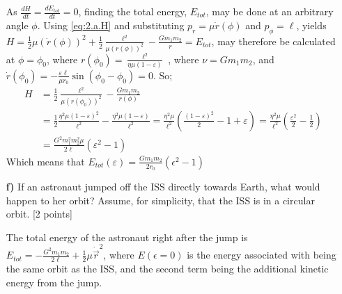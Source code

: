 \documentclass[11pt,a4paper]{report}
\newcounter{excount}[chapter]
\newenvironment{exercise}[1][]{\addtocounter{excount}{1} \noindent {\bf Question
    \arabic{excount} \ \ #1}\hspace{2mm}}{\vspace{4mm}}
\begin{document}
\begin{exercise}{\bf Orbital motion\\}
\begin{itemize}
As $\frac{dH}{dt}=\frac{dE_{tot}}{dt}=0$, finding the total energy, $E_{tot}$, may be done at an arbitrary angle $\phi$. Using  \eqref{eq:2.a.H} and substituting  $p_r=\mu \dot{r}(\phi)$ and $p_\phi=\ell$, yields $H=\frac{1}{2}\mu(\dot{r}(\phi))^2+\frac{1}{2}\frac{\ell^2}{\mu (r(\phi))^2}-\frac{Gm_1m_2}{r}=E_{tot}$, may therefore be calculated at $\phi=\phi_0$, where  $r(\phi_0)=\frac{\ell^2}{\eta \mu(1-\varepsilon)}$ , where $\nu=Gm_1m_2$, and $\dot{r}(\phi_0)=-\frac{\varepsilon \ell}{\mu r_0}\sin(\phi_0-\phi_0)=0$. So;
\begin{align*}
	H&=\frac{1}{2}\frac{\ell^2}{\mu (r(\phi_0))^2}-\frac{Gm_1m_2}{r(\phi)} \\
	&=\frac{1}{2}\frac{\eta^2\mu(1-\varepsilon)^2}{\ell^2}-\frac{\eta^2 \mu(1-\varepsilon)}{\ell^2}=\frac{\eta^2 \mu}{\ell^2}\left(\frac{(1-\varepsilon)^2}{2}-1+\varepsilon\right)=\frac{\eta^2 \mu}{\ell^2}(\frac{\varepsilon^2}{2}-\frac{1}{2})\\
	&=\frac{G^2m_1^2m_2^2 \mu}{2\ell}(\varepsilon^2-1)
\end{align*}
Which means that $E_{tot}(\varepsilon)=\frac{Gm_1m_2}{2r_0}(\epsilon^2-1)$



\item[{\bf f)}] If an astronaut jumped off the ISS directly towards Earth, what would happen to her orbit? Assume, for simplicity, that the ISS is in a circular orbit. [2 points] \par

The total energy of the astronaut right after the jump is $E_{tot}=-\frac{G^2m_1m_2}{2\ell}+\frac{1}{2} \mu \dot{\vec{r}}^2$, where $E(\epsilon=0)$ is the energy associated with being the same orbit as the ISS, and the second term being the additional kinetic energy from the jump. 


\end{itemize}
\end{exercise}
\end{document}
